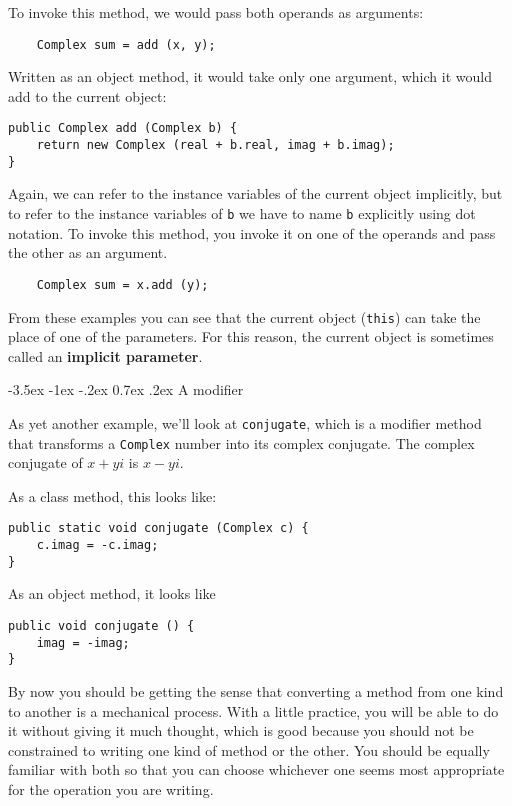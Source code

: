 \documentclass{book}
\makeatletter
\renewcommand{\section}{\@startsection 
    {section} {1} {0mm}%
    {-3.5ex \@plus -1ex \@minus -.2ex}%
    {0.7ex \@plus.2ex}%
    {\normalfont\Large\bfseries}}
\makeatother
\begin{document}
To invoke this method, we would pass both operands as arguments:

\begin{verbatim}
    Complex sum = add (x, y);
\end{verbatim}

Written as an object method, it would take only one argument,
which it would add to the current object:

\begin{verbatim}
public Complex add (Complex b) {
    return new Complex (real + b.real, imag + b.imag);
}
\end{verbatim}

Again, we can refer to the instance variables of the current
object implicitly, but to refer to the instance variables of
{\tt b} we have to name {\tt b} explicitly using dot notation.
To invoke this method, you invoke it on one of the operands
and pass the other as an argument.


\begin{verbatim}
    Complex sum = x.add (y);
\end{verbatim}

From these examples you can see that the current object ({\tt this})
can take the place of one of the parameters.  For this reason,
the current object is sometimes called an {\bf implicit parameter}.


\section{A modifier}

As yet another example, we'll look at {\tt conjugate}, which is
a modifier method that transforms a {\tt Complex} number into
its complex conjugate.  The complex conjugate of $x + yi$ is
$x - yi$.

As a class method, this looks like:

\begin{verbatim}
public static void conjugate (Complex c) {
    c.imag = -c.imag;
}
\end{verbatim}

As an object method, it looks like

\begin{verbatim}
public void conjugate () {
    imag = -imag;
}
\end{verbatim}

By now you should be getting the sense that converting a method
from one kind to another is a mechanical process.  With a little
practice, you will be able to do it without giving it much
thought, which is good because you should not be constrained to
writing one kind of method or the other.  You should be equally
familiar with both so that you can choose whichever one seems
most appropriate for the operation you are writing.
\end{document}
